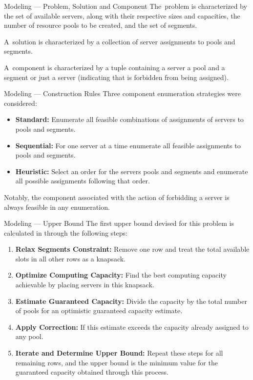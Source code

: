 \begin{frame}{Modeling --- Problem, Solution and Component}
  The~\alert{problem} is characterized by the set of available servers, along with
  their respective sizes and capacities, the number of resource pools to be
  created, and the set of segments.

  A~\alert{solution} is characterized by a collection of server assignments to
  pools and segments.

  A~\alert{component} is characterized by a tuple containing a server
  a pool and a segment or just a server (indicating that is forbidden from being assigned).
\end{frame}

\begin{frame}{Modeling --- Construction Rules}
  Three component enumeration strategies were considered:

  \begin{itemize}
    \item \textbf{Standard:} Enumerate all feasible combinations of assignments
          of servers to pools and segments.
    \item \textbf{Sequential:} For one server at a time enumerate all feasible
          assignments to pools and segments.
    \item \textbf{Heuristic:} Select an order for the servers pools and segments
          and enumerate all possible assignments following that order.
  \end{itemize}

  Notably, the component associated with the action of forbidding a server is
  always feasible in any enumeration.
\end{frame}

\begin{frame}{Modeling --- Upper Bound}
  The first upper bound devised for this problem is calculated in through the following steps:
  \begin{enumerate}
    \item \textbf{Relax Segments Constraint:} Remove one row and treat the total available slots in all other rows as a knapsack.

    \item \textbf{Optimize Computing Capacity:} Find the best computing capacity achievable by placing servers in this knapsack.

    \item \textbf{Estimate Guaranteed Capacity:} Divide the capacity by the total number of pools for an optimistic guaranteed capacity estimate.

    \item \textbf{Apply Correction:} If this estimate exceeds the capacity already assigned to any pool.

    \item \textbf{Iterate and Determine Upper Bound:} Repeat these steps for all
          remaining rows, and the upper bound is the minimum value for the guaranteed
          capacity obtained through this process.
  \end{enumerate}

\end{frame}

